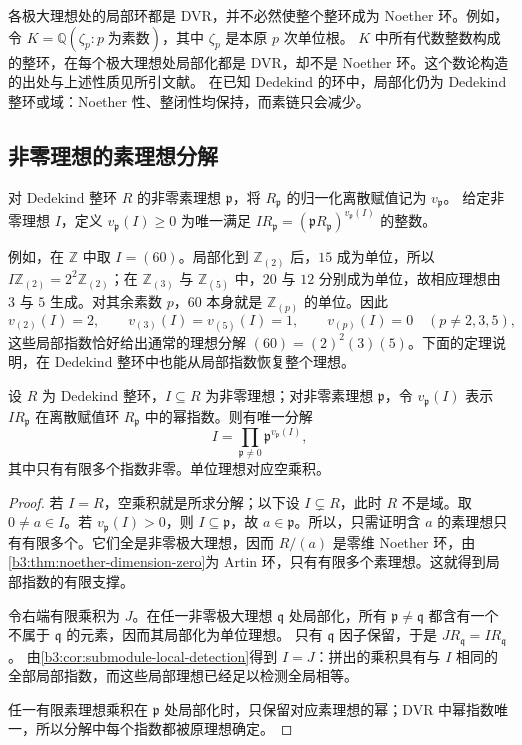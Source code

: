 各极大理想处的局部环都是 DVR，并不必然使整个整环成为 Noether 环。例如，令 \(K=\mathbb Q(\zeta_p:p\;\text{为素数})\)，其中 \(\zeta_p\) 是本原 \(p\) 次单位根。 \(K\) 中所有代数整数构成的整环，在每个极大理想处局部化都是 DVR，却不是 Noether 环。这个数论构造的出处与上述性质见所引文献\cite[Section 2, p. 280]{loper2006almostDedekind}。 在已知 Dedekind 的环中，局部化仍为 Dedekind 整环或域：Noether 性、整闭性均保持，而素链只会减少。

\subsection{非零理想的素理想分解}
\label{b3:subsec:1003:02}

对 Dedekind 整环 \(R\) 的非零素理想 \(\mathfrak p\)，将 \(R_{\mathfrak p}\) 的归一化离散赋值记为 \(v_{\mathfrak p}\)。 给定非零理想 \(I\)，定义 \(v_{\mathfrak p}(I)\ge0\) 为唯一满足 \(IR_{\mathfrak p}=(\mathfrak pR_{\mathfrak p})^{v_{\mathfrak p}(I)}\) 的整数。

例如，在 \(\mathbb Z\) 中取 \(I=(60)\)。局部化到 \(\mathbb Z_{(2)}\) 后，\(15\) 成为单位，所以 \(I\mathbb Z_{(2)}=2^2\mathbb Z_{(2)}\)；在 \(\mathbb Z_{(3)}\) 与 \(\mathbb Z_{(5)}\) 中，\(20\) 与 \(12\) 分别成为单位，故相应理想由 \(3\) 与 \(5\) 生成。对其余素数 \(p\)，\(60\) 本身就是 \(\mathbb Z_{(p)}\) 的单位。因此
\[
	v_{(2)}(I)=2,\qquad v_{(3)}(I)=v_{(5)}(I)=1, \qquad v_{(p)}(I)=0\quad(p\ne2,3,5),
\]
这些局部指数恰好给出通常的理想分解 \((60)=(2)^2(3)(5)\)。下面的定理说明，在 Dedekind 整环中也能从局部指数恢复整个理想。

\begin{theorem}\label{b3:thm:dedekind-factorization}
	设 \(R\) 为 Dedekind 整环，\(I\subseteq R\) 为非零理想；对非零素理想 \(\mathfrak p\)，令 \(v_{\mathfrak p}(I)\) 表示 \(IR_{\mathfrak p}\) 在离散赋值环 \(R_{\mathfrak p}\) 中的幂指数。则有唯一分解
	\[
		I=\prod_{\mathfrak p\ne0}\mathfrak p^{v_{\mathfrak p}(I)},
	\]
	其中只有有限多个指数非零。单位理想对应空乘积。
\end{theorem}
\begin{proof}
	若 \(I=R\)，空乘积就是所求分解；以下设 \(I\subsetneq R\)，此时 \(R\) 不是域。取 \(0\ne a\in I\)。若 \(v_{\mathfrak p}(I)>0\)，则 \(I\subseteq\mathfrak p\)，故 \(a\in\mathfrak p\)。所以，只需证明含 \(a\) 的素理想只有有限多个。它们全是非零极大理想，因而 \(R/(a)\) 是零维 Noether 环，由\cref{b3:thm:noether-dimension-zero}为 Artin 环，只有有限多个素理想。这就得到局部指数的有限支撑。

	令右端有限乘积为 \(J\)。在任一非零极大理想 \(\mathfrak q\) 处局部化，所有 \(\mathfrak p\ne\mathfrak q\) 都含有一个不属于 \(\mathfrak q\) 的元素，因而其局部化为单位理想。 只有 \(\mathfrak q\) 因子保留，于是 \(JR_{\mathfrak q}=IR_{\mathfrak q}\)。 由\cref{b3:cor:submodule-local-detection}得到 \(I=J\)：拼出的乘积具有与 \(I\) 相同的全部局部指数，而这些局部理想已经足以检测全局相等。

	任一有限素理想乘积在 \(\mathfrak p\) 处局部化时，只保留对应素理想的幂；DVR 中幂指数唯一，所以分解中每个指数都被原理想确定。
\end{proof}

